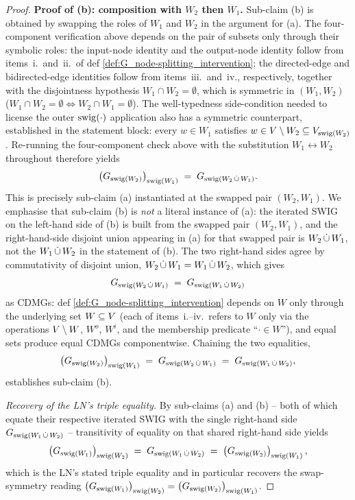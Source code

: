 \documentclass[main]{subfiles}
\begin{document}
\begin{proof}
\medskip\noindent\textbf{Proof of (b): composition with $W_2$ then $W_1$.}
Sub-claim (b) is obtained by swapping the roles of $W_1$ and $W_2$ in the argument for (a). The four-component verification above depends on the pair of subsets only through their symbolic roles: the input-node identity and the output-node identity follow from items~i.\ and~ii.\ of def \ref{def:G_node-splitting_intervention}; the directed-edge and bidirected-edge identities follow from items~iii.\ and~iv., respectively, together with the disjointness hypothesis $W_1 \cap W_2 = \emptyset$, which is symmetric in $(W_1, W_2)$ ($W_1 \cap W_2 = \emptyset \Leftrightarrow W_2 \cap W_1 = \emptyset$). The well-typedness side-condition needed to license the outer $\mathrm{swig}(\cdot)$ application also has a symmetric counterpart, established in the statement block: every $w \in W_1$ satisfies $w \in V \setminus W_2 \subseteq V_{\mathrm{swig}(W_2)}$. Re-running the four-component check above with the substitution $W_1 \leftrightarrow W_2$ throughout therefore yields
\[ \left ( G_{\mathrm{swig}(W_2)} \right )_{\mathrm{swig}(W_1)} \;=\; G_{\mathrm{swig}(W_2 \,\dot{\cup}\, W_1)}. \]
This is precisely sub-claim (a) instantiated at the swapped pair $(W_2, W_1)$. We emphasise that sub-claim (b) is \emph{not} a literal instance of (a): the iterated SWIG on the left-hand side of (b) is built from the swapped pair $(W_2, W_1)$, and the right-hand-side disjoint union appearing in (a) for that swapped pair is $W_2 \,\dot{\cup}\, W_1$, not the $W_1 \,\dot{\cup}\, W_2$ in the statement of (b). The two right-hand sides agree by commutativity of disjoint union, $W_2 \,\dot{\cup}\, W_1 = W_1 \,\dot{\cup}\, W_2$, which gives
\[ G_{\mathrm{swig}(W_2 \,\dot{\cup}\, W_1)} \;=\; G_{\mathrm{swig}(W_1 \,\dot{\cup}\, W_2)} \]
as CDMGs: def \ref{def:G_node-splitting_intervention} depends on $W$ only through the underlying set $W \subseteq V$ (each of items~i.--iv.\ refers to $W$ only via the operations $V \setminus W$, $W^o$, $W^i$, and the membership predicate ``$\cdot \in W$''), and equal sets produce equal CDMGs componentwise. Chaining the two equalities,
\[ \left ( G_{\mathrm{swig}(W_2)} \right )_{\mathrm{swig}(W_1)} \;=\; G_{\mathrm{swig}(W_2 \,\dot{\cup}\, W_1)} \;=\; G_{\mathrm{swig}(W_1 \,\dot{\cup}\, W_2)}, \]
establishes sub-claim (b).

\medskip\noindent\emph{Recovery of the LN's triple equality.}
By sub-claims (a) and (b) -- both of which equate their respective iterated SWIG with the single right-hand side $G_{\mathrm{swig}(W_1 \,\dot{\cup}\, W_2)}$ -- transitivity of equality on that shared right-hand side yields
\[ \left ( G_{\mathrm{swig}(W_1)} \right )_{\mathrm{swig}(W_2)} \;=\; G_{\mathrm{swig}(W_1 \,\dot{\cup}\, W_2)} \;=\; \left ( G_{\mathrm{swig}(W_2)} \right )_{\mathrm{swig}(W_1)}, \]
which is the LN's stated triple equality and in particular recovers the swap-symmetry reading $\left ( G_{\mathrm{swig}(W_1)} \right )_{\mathrm{swig}(W_2)} = \left ( G_{\mathrm{swig}(W_2)} \right )_{\mathrm{swig}(W_1)}$.


\end{proof}
\end{document}
